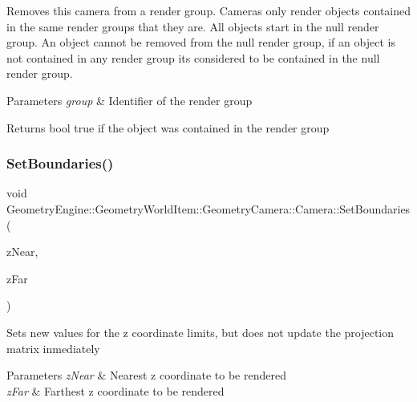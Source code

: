 Removes this camera from a render group. Cameras only render objects contained in the same render groups that they are. All objects start in the null render group. An object cannot be removed from the null render group, if an object is not contained in any render group it\textquotesingle{}s considered to be contained in the null render group. 
\begin{DoxyParams}{Parameters}
{\em group} & Identifier of the render group \\
\hline
\end{DoxyParams}
\begin{DoxyReturn}{Returns}
bool true if the object was contained in the render group 
\end{DoxyReturn}
\mbox{\label{class_geometry_engine_1_1_geometry_world_item_1_1_geometry_camera_1_1_camera_acf991463c9975a3b0dd047bb73a7dc95}} 
\subsubsection{\texorpdfstring{SetBoundaries()}{SetBoundaries()}}
{\footnotesize\ttfamily void Geometry\+Engine\+::\+Geometry\+World\+Item\+::\+Geometry\+Camera\+::\+Camera\+::\+Set\+Boundaries (\begin{DoxyParamCaption}\item[{G\+Ldouble}]{z\+Near,  }\item[{G\+Ldouble}]{z\+Far }\end{DoxyParamCaption})}

Sets new values for the z coordinate limits, but does not update the projection matrix inmediately 
\begin{DoxyParams}{Parameters}
{\em z\+Near} & Nearest z coordinate to be rendered \\
\hline
{\em z\+Far} & Farthest z coordinate to be rendered \\
\hline
\end{DoxyParams}
\mbox{\label{class_geometry_engine_1_1_geometry_world_item_1_1_geometry_camera_1_1_camera_a96954629a05eba955adc1dff2df1fbdb}} 
